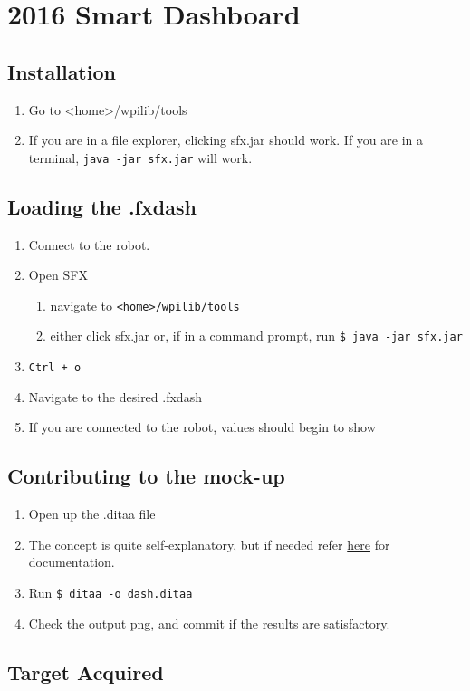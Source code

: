 \documentclass[11pt]{article}
\author{Kawin Nikomborirak}
\date{\today}
\title{}
\begin{document}
\section{2016 Smart Dashboard}
\label{sec:orgheadline5}
\subsection{Installation}
\label{sec:orgheadline1}
\begin{enumerate}
\item Go to <home>/wpilib/tools
\item If you are in a file explorer, clicking sfx.jar should work.
If you are in a terminal, \texttt{java -jar sfx.jar} will work.
\end{enumerate}
\subsection{Loading the .fxdash}
\label{sec:orgheadline2}
\begin{enumerate}
\item Connect to the robot.
\item Open SFX
\begin{enumerate}
\item navigate to \texttt{<home>/wpilib/tools}
\item either click sfx.jar or, if in a command prompt, run \texttt{\$ java -jar sfx.jar}
\end{enumerate}
\item \texttt{Ctrl + o}
\item Navigate to the desired .fxdash
\item If you are connected to the robot, values should begin to show
\end{enumerate}
\subsection{Contributing to the mock-up}
\label{sec:orgheadline3}
\begin{enumerate}
\item Open up the .ditaa file
\item The concept is quite self-explanatory, but if needed refer \href{http://ditaa.sourceforge.net/}{here} for documentation.
\item Run \texttt{\$ ditaa -o dash.ditaa}
\item Check the output png, and commit if the results are satisfactory.
\end{enumerate}
\subsection{Target Acquired}
\label{sec:orgheadline4}
\end{document}

